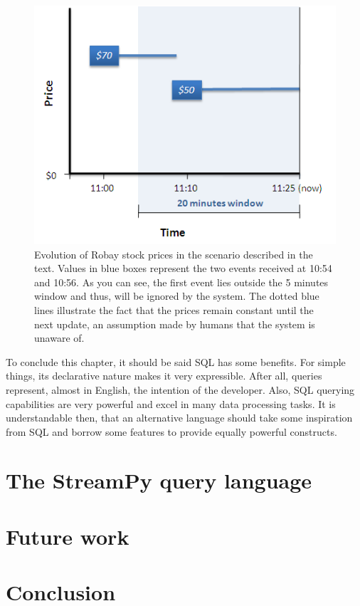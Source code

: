 \documentclass{report}
\begin{document}
\begin{figure}[htbp]
  \includegraphics[width=\textwidth]{outside-window.png}
  \caption{Evolution of Robay stock prices in the scenario described
    in the text. Values in blue boxes represent the two events
    received at 10:54 and 10:56. As you can see, the first event lies
    outside the 5 minutes window and thus, will be ignored by the
    system. The dotted blue lines illustrate the fact that the prices
    remain constant until the next update, an assumption made by
    humans that the system is unaware of.}
  \label{fig:outside-window}
\end{figure}

To conclude this chapter, it should be said SQL has some benefits. For
simple things, its declarative nature makes it very expressible. After
all, queries represent, almost in English, the intention of the
developer. Also, SQL querying capabilities are very powerful and excel
in many data processing tasks. It is understandable then, that an
alternative language should take some inspiration from SQL and borrow
some features to provide equally powerful constructs.


\chapter{The StreamPy query language}
\label{chap:streampy}

\chapter{Future work}
\label{chap:future-work}

\chapter{Conclusion}
\label{chap:conclusion}
\end{document}
